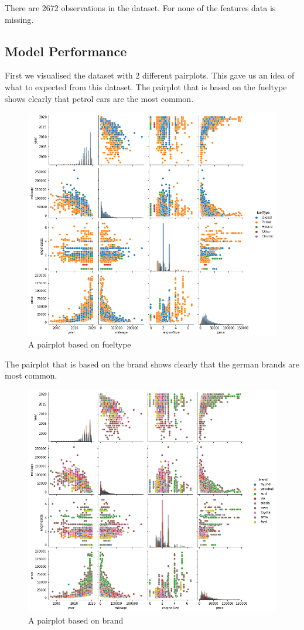 \noindent There are 2672 observations in the dataset. For none of the features data is missing.

\subsection{Model Performance}

First we visualised the dataset with 2 different pairplots.
This gave us an idea of what to expected from this dataset.
The pairplot that is based on the fueltype shows clearly that petrol cars are the most common.
\begin{figure}
    \includegraphics[width=\linewidth]{images/pairplot_fueltype.png}
    \caption{A pairplot based on fueltype}
    \label{fig:pairplot fueltype}
\end{figure}
The pairplot that is based on the brand shows clearly that the german brands are most common.
\begin{figure}
    \includegraphics[width=\linewidth]{images/pairplot_brand.png}
    \caption{A pairplot based on brand}
    \label{fig:pairplot brand}
\end{figure}

